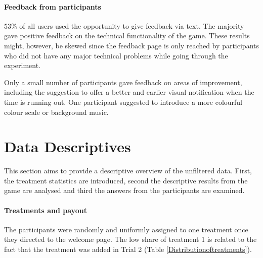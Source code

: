 \paragraph{Feedback from participants}
53\% of all users used the opportunity to give feedback via text. The majority gave positive feedback on the technical functionality of the game. These results might, however, be skewed since the feedback page is only reached by participants who did not have any major technical problems while going through the experiment.

Only a small number of participants gave feedback on areas of improvement, including the suggestion to offer a better and earlier visual notification when the time is running out. One participant suggested to introduce a more colourful colour scale or background music.


\section{Data Descriptives}
\label{ch:Experiment:sec:DataacquisitionDescriptives:subsec:DescriptiveStatistics}

This section aims to provide a descriptive overview of the unfiltered data. First, the treatment statistics are introduced, second the descriptive results from the game are analysed and third the answers from the participants are examined.
\paragraph{Treatments and payout}
\label{ch:Evaluation:sec:DescriptiveStatistics:subsec:Distributionoftreatments}

The participants were randomly and uniformly assigned to one treatment once they directed to the welcome page. The low share of treatment 1 is related to the fact that the treatment was added in Trial 2 (Table \ref{Distributionoftreatments}).

